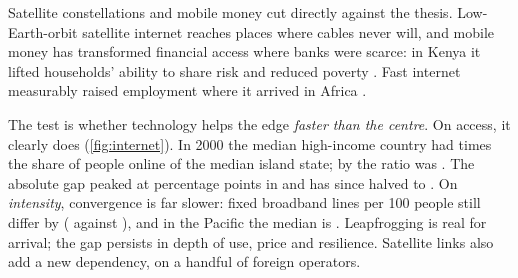 \begin{counterpoint}[Leapfrogging]
Satellite constellations and mobile money cut directly against the thesis.
Low-Earth-orbit satellite internet reaches places where cables never will,
and mobile money has transformed financial access where banks were scarce:
in Kenya it lifted households' ability to share risk
\parencite{jack2014} and reduced poverty \parencite{suri2016}. Fast internet
measurably raised employment where it arrived in Africa
\parencite{hjort2019}.

The test is whether technology helps the edge \emph{faster than the centre}.
On access, it clearly does (\cref{fig:internet}). In 2000 the median
high-income country had \netRatioFirst{} times the share of people online of the
median island state; by \windowEnd{} the ratio was \netRatioLast. The
absolute gap peaked at \netGapPeak{} percentage points in \netGapPeakYear{} and
has since halved to \netGapLast. On \emph{intensity}, convergence is far
slower: fixed broadband lines per 100 people still differ by \bbGapLast{}
(\bbSidsLast{} against \bbHicLast), and in the Pacific the median is
\bbPacificLast. Leapfrogging is real for arrival; the gap persists in depth
of use, price and resilience. Satellite links also add a new dependency, on a
handful of foreign operators.
\end{counterpoint}


